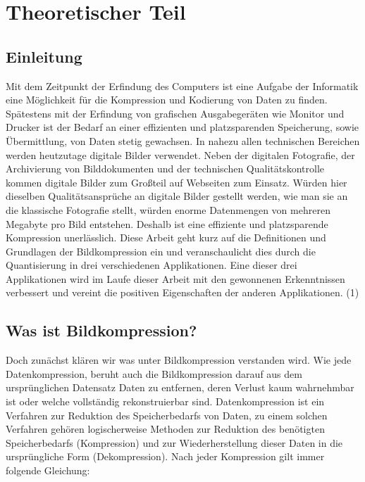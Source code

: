 
\section{Theoretischer Teil}

\subsection{\textbf{Einleitung}}
Mit dem Zeitpunkt der Erfindung des Computers ist eine Aufgabe der Informatik eine Möglichkeit für die Kompression und Kodierung von Daten zu finden. Spätestens mit der Erfindung von grafischen Ausgabegeräten wie Monitor und Drucker ist der Bedarf an einer effizienten und platzsparenden Speicherung, sowie Übermittlung, von Daten stetig gewachsen. In nahezu allen technischen Bereichen werden heutzutage digitale Bilder verwendet. Neben der digitalen Fotografie, der Archivierung von Bilddokumenten und der technischen Qualitätskontrolle kommen digitale Bilder zum Großteil auf Webseiten zum Einsatz. Würden hier dieselben Qualitätsansprüche an digitale Bilder gestellt werden, wie man sie an die klassische Fotografie stellt, würden enorme Datenmengen von mehreren Megabyte pro Bild entstehen. Deshalb ist eine effiziente und platzsparende Kompression unerlässlich. Diese Arbeit geht kurz auf die Definitionen und Grundlagen der Bildkompression ein und veranschaulicht dies durch die Quantisierung in drei verschiedenen Applikationen. Eine dieser drei Applikationen wird im Laufe dieser Arbeit mit den gewonnenen Erkenntnissen verbessert und vereint die positiven Eigenschaften der anderen Applikationen. (1)
\subsection{\textbf{Was ist Bildkompression?}}
Doch zunächst klären wir was unter Bildkompression verstanden wird. Wie jede Datenkompression, beruht auch die Bildkompression darauf aus dem ursprünglichen Datensatz Daten zu entfernen, deren Verlust kaum wahrnehmbar ist oder welche vollständig rekonstruierbar sind. Datenkompression ist ein Verfahren zur Reduktion des Speicherbedarfs von Daten, zu einem solchen Verfahren gehören logischerweise Methoden zur Reduktion des benötigten Speicherbedarfs (Kompression) und zur Wiederherstellung dieser Daten in die ursprüngliche Form (Dekompression). Nach jeder Kompression gilt immer folgende Gleichung:


